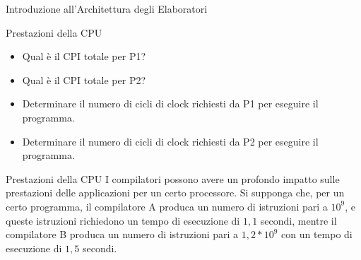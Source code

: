 \documentclass[11pt]{article}
\begin{document}
\begin{quiz}{Introduzione all'Architettura degli Elaboratori}
\begin{cloze}[points=1,shuffle=true]{Prestazioni della CPU}
\begin{itemize}
    \item Qual è il CPI totale per P1? 
    \item Qual è il CPI totale per P2? 
    \item Determinare il numero di cicli di clock richiesti da P1 per eseguire il programma.
    \item Determinare il numero di cicli di clock richiesti da P2 per eseguire il programma.
\end{itemize}
\end{cloze}

\begin{cloze}[points=1,shuffle=false]{Prestazioni della CPU}
I compilatori possono avere un profondo impatto sulle prestazioni delle applicazioni per un certo processore. Si supponga che, per un certo programma, il compilatore A produca un numero di istruzioni pari a $10^9$, e queste istruzioni richiedono un tempo di esecuzione di $1,1$ secondi, mentre il compilatore B produca un numero di istruzioni pari a $1,2 * 10^9$ con un tempo di esecuzione di $1,5$ secondi.


\end{cloze}
\end{quiz}
\end{document}
